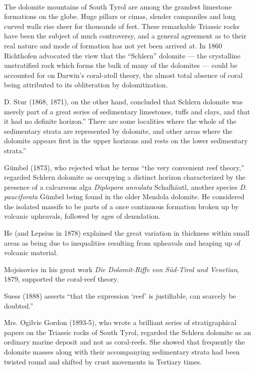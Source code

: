 \documentclass[a4paper, 12pt, oneside, landscape]{article}
\begin{document}
\paragraph{}
The dolomite mountains of South Tyrol are among the grandest limestone formations on the globe. Huge pillars or cimas, slender campaniles and long curved walls rise sheer for thousands of feet. These remarkable Triassic rocks have been the subject of much controversy, and a general agreement as to their real nature and mode of formation has not yet been arrived at. In 1860 Richthofen advocated the view that the ``Schlern'' dolomite --- the crystalline unstratified rock which forms the bulk of many of the dolomites --- could be accounted for on Darwin's coral-atoll theory, the almost total absence of coral being attributed to its obliteration by dolomitization.

D. Stur (1868, 1871), on the other hand, concluded that Schlern dolomite was merely part of a great series of sedimentary limestones, tuffs and clays, and that it had no definite horizon.'' There are some localities where the whole of the sedimentary strata are represented by dolomite, and other areas where the dolomite appears first in the upper horizons and rests on the lower sedimentary strata.''

Gümbel (1873), who rejected what he terms ``the very convenient reef theory,'' regarded Schlern dolomite as occupying a distinct horizon characterized by the presence of a calcareous alga \emph{Diplopora annulata} Schafhäutl, another species \emph{D. pauciforata} Gümbel being found in the older Mendola dolomite. He considered the isolated massifs to be parts of a once continuous formation broken up by volcanic upheavals, followed by ages of denudation.

He (and Lepsius in 1878) explained the great variation in thickness within small areas as being due to inequalities resulting from upheavals and heaping up of volcanic material.

Mojsisovics in his great work \emph{Die Dolomit-Riffe von Süd-Tirol und Venetian}, 1879, supported the coral-reef theory.

Suess (1888) asserts ``that the expression `reef' is justifiable, can scarcely be doubted.''

Mrs. Ogilvie Gordon (1893-5), who wrote a brilliant series of stratigraphical papers on the Triassic rocks of South Tyrol, regarded the Schlern dolomite as an ordinary marine deposit and not as coral-reefs. She showed that frequently the dolomite masses along with their accompanying sedimentary strata had been twisted round and shifted by crust movements in Tertiary times.
\end{document}
